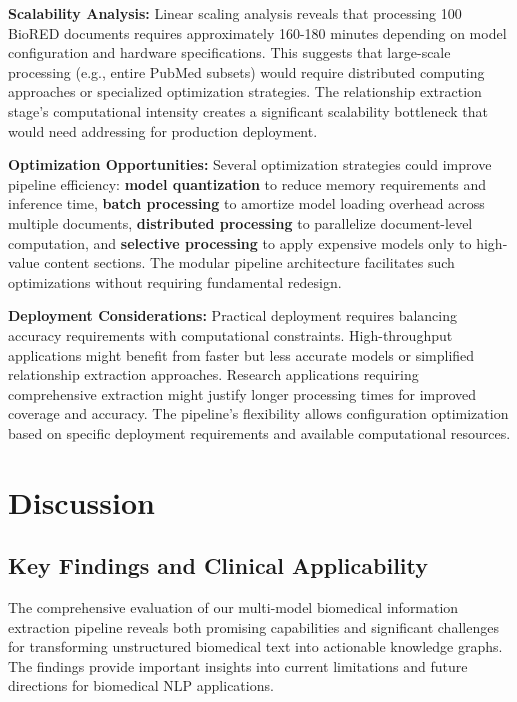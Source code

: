 \textbf{Scalability Analysis:} Linear scaling analysis reveals that processing 100 BioRED documents requires approximately 160-180 minutes depending on model configuration and hardware specifications. This suggests that large-scale processing (e.g., entire PubMed subsets) would require distributed computing approaches or specialized optimization strategies. The relationship extraction stage's computational intensity creates a significant scalability bottleneck that would need addressing for production deployment.

\textbf{Optimization Opportunities:} Several optimization strategies could improve pipeline efficiency: \textbf{model quantization} to reduce memory requirements and inference time, \textbf{batch processing} to amortize model loading overhead across multiple documents, \textbf{distributed processing} to parallelize document-level computation, and \textbf{selective processing} to apply expensive models only to high-value content sections. The modular pipeline architecture facilitates such optimizations without requiring fundamental redesign.

\textbf{Deployment Considerations:} Practical deployment requires balancing accuracy requirements with computational constraints. High-throughput applications might benefit from faster but less accurate models or simplified relationship extraction approaches. Research applications requiring comprehensive extraction might justify longer processing times for improved coverage and accuracy. The pipeline's flexibility allows configuration optimization based on specific deployment requirements and available computational resources.


\section{Discussion}

\subsection{Key Findings and Clinical Applicability}

The comprehensive evaluation of our multi-model biomedical information extraction pipeline reveals both promising capabilities and significant challenges for transforming unstructured biomedical text into actionable knowledge graphs. The findings provide important insights into current limitations and future directions for biomedical NLP applications.

